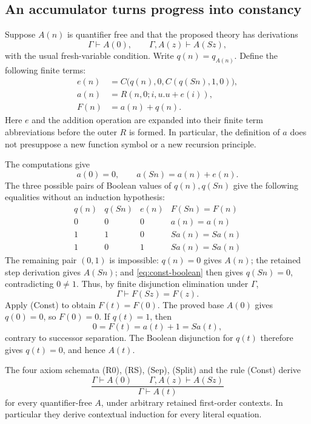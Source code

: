 \subsection{An accumulator turns progress into constancy}

Suppose $A(n)$ is quantifier free and that the proposed theory has
derivations
\[
 \Gamma\vdash A(0),\qquad
 \Gamma,A(z)\vdash A(Sz),
\]
with the usual fresh-variable condition.  Write $q(n)=q_{A(n)}$.
Define the following finite terms:
\begin{align*}
 e(n)&=C\bigl(q(n),0,C(q(Sn),1,0)\bigr),\\
 a(n)&=R(n,0;i,u.u+e(i)),\\
 F(n)&=a(n)+q(n).
\end{align*}
Here $e$ and the addition operation are expanded into their finite term
abbreviations before the outer $R$ is formed.  In particular, the
definition of $a$ does not presuppose a new function symbol or a new
recursion principle.

The computations give
\[
 a(0)=0,\qquad a(Sn)=a(n)+e(n).
\]
The three possible pairs of Boolean values of $q(n),q(Sn)$ give the
following equalities without an induction hypothesis:
\[
\begin{array}{c|c|c|c}
 q(n)&q(Sn)&e(n)&F(Sn)=F(n)\\ \hline
 0&0&0&a(n)=a(n)\\
 1&1&0&Sa(n)=Sa(n)\\
 1&0&1&Sa(n)=Sa(n)
\end{array}
\]
The remaining pair $(0,1)$ is impossible: $q(n)=0$ gives $A(n)$;
the retained step derivation gives $A(Sn)$; and
\eqref{eq:const-boolean} then gives $q(Sn)=0$, contradicting $0\ne1$.
Thus, by finite disjunction elimination under $\Gamma$,
\[
                       \Gamma\vdash F(Sz)=F(z).
\]
Apply \textup{(Const)} to obtain $F(t)=F(0)$.  The proved base $A(0)$
gives $q(0)=0$, so $F(0)=0$.  If $q(t)=1$, then
\[
                 0=F(t)=a(t)+1=Sa(t),
\]
contrary to successor separation.  The Boolean disjunction for $q(t)$
therefore gives $q(t)=0$, and hence $A(t)$.

\begin{theorem}
The four axiom schemata \textup{(R0)}, \textup{(RS)}, \textup{(Sep)},
\textup{(Split)} and the rule \textup{(Const)} derive
\[
 \frac{\Gamma\vdash A(0)\qquad\Gamma,A(z)\vdash A(Sz)}
      {\Gamma\vdash A(t)}
\]
for every quantifier-free $A$, under arbitrary retained first-order
contexts.  In particular they derive contextual induction for every
literal equation.
\end{theorem}

